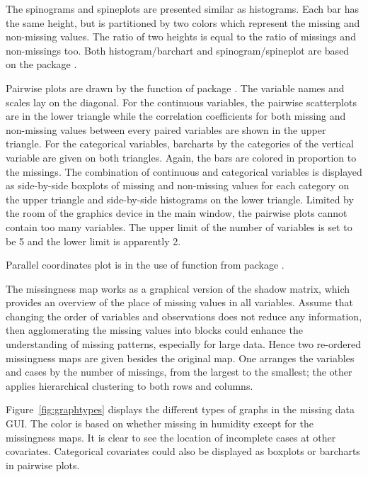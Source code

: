\documentclass[article]{jss}
\begin{document}
The spinograms and spineplots are presented similar as histograms. Each bar has the same height, but is partitioned by two colors which represent the missing and non-missing values. The ratio of two heights is equal to the ratio of missings and non-missings too. Both histogram/barchart and spinogram/spineplot are based on the package  \citep{ggplot2}.

Pairwise plots are drawn by the function  of package  \citep{ggally}. The variable names and scales lay on the diagonal. For the continuous variables, the pairwise scatterplots are in the lower triangle while the correlation coefficients for both missing and non-missing values between every paired variables are shown in the upper triangle. For the categorical variables, barcharts by the categories of the vertical variable are given on both triangles. Again, the bars are colored in proportion to the missings. The combination of continuous and categorical variables is displayed as side-by-side boxplots of missing and non-missing values for each category on the upper triangle and side-by-side histograms on the lower triangle. Limited by the room of the graphics device in the main window, the pairwise plots cannot contain too many variables. The upper limit of the number of variables is set to be 5 and the lower limit is apparently 2.

Parallel coordinates plot is in the use of function  from package  \citep{ggplot2}.

The missingness map works as a graphical version of the shadow matrix, which provides an overview of the place of missing values in all variables. Assume that changing the order of variables and observations does not reduce any information, then agglomerating the missing values into blocks could enhance the understanding of missing patterns, especially for large data. Hence two re-ordered missingness maps are given besides the original map. One arranges the variables and cases by the number of missings, from the largest to the smallest; the other applies hierarchical clustering to both rows and columns.

Figure~\ref{fig:graphtypes} displays the different types of graphs in the missing data GUI. The color is based on whether missing in humidity except for the missingness maps. It is clear to see the location of incomplete cases at other covariates. Categorical covariates could also be displayed as boxplots or barcharts in pairwise plots. 
\end{document}

